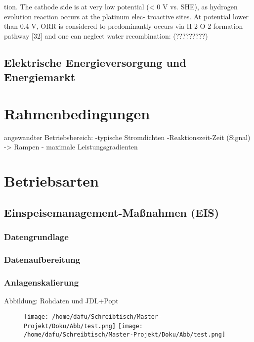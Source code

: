 \documentclass[onecolumn,10pt,titlepage]{article}
\begin{document}
tion. The cathode side is at very low potential (< 0 V vs. SHE),
as hydrogen evolution reaction occurs at the platinum elec-
troactive sites. At potential lower than 0.4 V, ORR is considered
to predominantly occurs via H 2 O 2 formation pathway [32] and
one can neglect water recombination: (?????????)

\subsection{Elektrische Energieversorgung und Energiemarkt}

\section{Rahmenbedingungen}
angewandter Betriebsbereich:
-typische Stromdichten
-Reaktionszeit-Zeit (Signal) -> Rampen
- maximale Leistungsgradienten




\section{Betriebsarten}
\label{sect_Betriebsarten}

\subsection{Einspeisemanagement-Maßnahmen (EIS)}
\subsubsection{Datengrundlage}
\subsubsection{Datenaufbereitung}
\subsubsection{Anlagenskalierung}
Abbildung: Rohdaten und JDL+Popt
\begin{figure}[H]
	
	\centering
	\texttt{[image: /home/dafu/Schreibtisch/Master-Projekt/Doku/Abb/test.png]}
	\texttt{[image: /home/dafu/Schreibtisch/Master-Projekt/Doku/Abb/test.png]}
	\caption{ }
	\label{fig:JDL_Eis} 
\end{figure}
\end{document}
